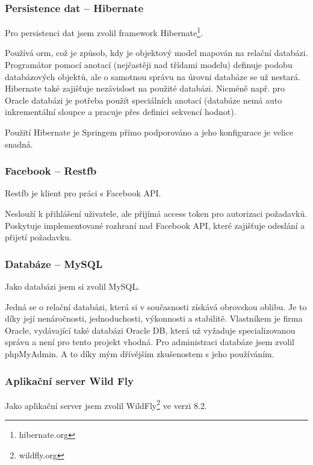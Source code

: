 \documentclass[thesis=B,czech]{FITthesis}[2012/06/26]
\begin{document}
\subsubsection{Persistence dat -- Hibernate}
\label{technology:hibernate}
Pro persistenci dat jsem zvolil framework Hibernate\footnote{hibernate.org}. 

Používá \acrshort{orm}, což je způsob, kdy je objektový model mapován na relační databázi. Programátor pomocí anotací (nejčastěji nad třídami modelu) definuje podobu databázových objektů, ale o samotnou správu na úrovni databáze se už nestará. Hibernate také zajišťuje nezávislost na použité databázi. Nicméně např. pro Oracle databázi je potřeba použít speciálních anotací (databáze nemá auto inkrementální sloupce a pracuje přes definici sekvencí hodnot).

Použití Hibernate je Springem přímo podporováno a jeho konfigurace je velice snadná.

\subsubsection{Facebook -- Restfb }
\label{design:technology_restfb}
Restfb je klient pro práci s Facebook API\cite{design_restapi_restf}. 

Neslouží k přihlášení uživatele, ale přijímá access token pro autorizaci požadavků. Poskytuje implementované rozhraní nad Facebook API, které zajišťuje odeslání a přijetí požadavku.

\subsubsection {Databáze -- MySQL}

Jako databázi jsem si zvolil MySQL. 

Jedná se o relační databázi, která si v současnosti získává obrovskou oblibu. Je to díky její nenáročnosti, jednoduchosti, výkonnosti a stabilitě. Vlastníkem je firma Oracle, vydávající také databázi Oracle DB, která už vyžaduje specializovanou správu a není pro tento projekt vhodná. Pro administraci databáze jsem zvolil phpMyAdmin. A to díky mým dřívějším zkušenostem s jeho používáním.  

\subsubsection {Aplikační server Wild Fly}

Jako aplikační server jsem zvolil WildFly\footnote{wildfly.org} ve verzi 8.2.\newline
\end{document}
